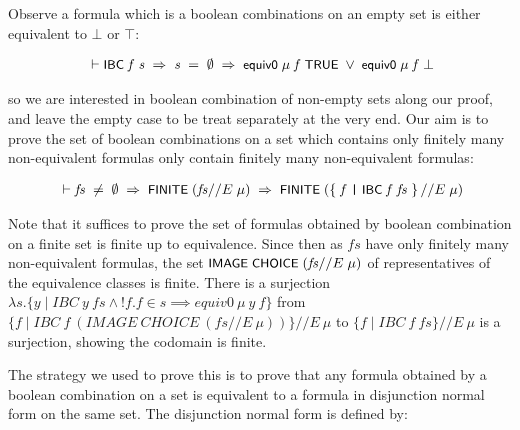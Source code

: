 \documentclass[letterpaper]{article}
\renewcommand{\HOLConst}[1]{{\textsf{\upshape\small #1}}}
\renewcommand{\HOLinline}[1]{\ensuremath{#1}}
\newenvironment{holmath}{\begin{displaymath}\begin{array}{l}}{\end{array}\end{displaymath}\ignorespacesafterend}
\begin{document}
Observe a formula which is a boolean combinations on an empty set is either equivalent to $\bot$ or $\top$:

\begin{holmath}
  \ensuremath{\HOLTokenTurnstile}\HOLConst{IBC}\;\HOLFreeVar{f}\;\HOLFreeVar{s}\;\HOLSymConst{\HOLTokenImp{}}\;\HOLFreeVar{s}\;\HOLSymConst{=}\;\HOLSymConst{\HOLTokenEmpty{}}\;\HOLSymConst{\HOLTokenImp{}}\;\HOLConst{equiv0}\;\HOLFreeVar{\ensuremath{\mu}}\;\HOLFreeVar{f}\;\HOLConst{TRUE}\;\HOLSymConst{\HOLTokenDisj{}}\;\HOLConst{equiv0}\;\HOLFreeVar{\ensuremath{\mu}}\;\HOLFreeVar{f}\;\HOLSymConst{\ensuremath{\bot}}
\end{holmath}

so we are interested in boolean combination of non-empty sets along our proof, and leave the empty case to be treat separately at the very end. Our aim is to prove the set of boolean combinations on a set which contains only finitely many non-equivalent formulas only contain finitely many non-equivalent formulas:

\begin{holmath}
  \ensuremath{\HOLTokenTurnstile}\HOLFreeVar{fs}\;\HOLSymConst{\HOLTokenNotEqual{}}\;\HOLSymConst{\HOLTokenEmpty{}}\;\HOLSymConst{\HOLTokenImp{}}\;\HOLConst{FINITE}\;(\HOLFreeVar{fs}\HOLSymConst{//E}\;\HOLFreeVar{\ensuremath{\mu}})\;\HOLSymConst{\HOLTokenImp{}}\;\HOLConst{FINITE}\;(\HOLTokenLeftbrace{}\HOLBoundVar{f}\;\HOLTokenBar{}\;\HOLConst{IBC}\;\HOLBoundVar{f}\;\HOLFreeVar{fs}\HOLTokenRightbrace{}\HOLSymConst{//E}\;\HOLFreeVar{\ensuremath{\mu}})
\end{holmath}

Note that it suffices to prove the set of formulas obtained by boolean combination on a finite set is finite up to equivalence. Since then as $fs$ have only finitely many non-equivalent formulas, the set \HOLinline{\HOLConst{IMAGE}\;\HOLConst{CHOICE}\;(\HOLFreeVar{fs}\HOLSymConst{//E}\;\HOLFreeVar{\ensuremath{\mu}})} of representatives of the equivalence classes is finite. There is a surjection $\lambda s. \{y \mid IBC\ y\ fs \land !f. f \in s \implies equiv0\ \mu\ y\ f\}$ from 
$\{f \mid IBC\ f\ (IMAGE\ CHOICE\ (fs//E\ \mu))\}//E\ \mu$ to $\{f \mid IBC\ f\ fs\}//E\ \mu$ is a surjection, showing the codomain is finite. 

The strategy we used to prove this is to prove that any formula obtained by a boolean combination on a set is equivalent to a formula in disjunction normal form on the same set. The disjunction normal form is defined by:
\end{document}
